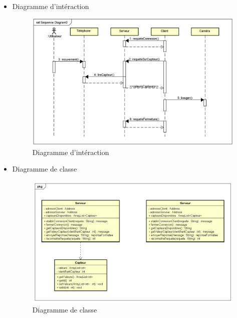 \begin{itemize}
\item Diagramme d'intéraction
	\begin{figure}[H]
		\centering
		\includegraphics[scale=0.5]{./images/diagrammeInteraction.png}
		\caption{Diagramme d'intéraction}
	\end{figure}
\newpage
\item Diagramme de classe
	\begin{figure}[H]
		\centering
		\includegraphics[scale=0.6]{./images/ClassDiagram.png}
		\caption{Diagramme de classe}
	\end{figure}
\end{itemize}